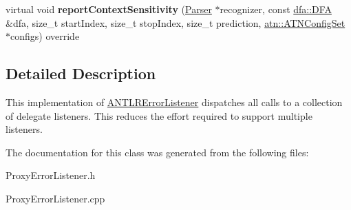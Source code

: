 \begin{DoxyCompactItemize}
\item 
\mbox{\label{classantlr4_1_1ProxyErrorListener_a56e2d5665e2077a9adc67ae70e1deb2a}} 
virtual void {\bfseries report\+Context\+Sensitivity} (\hyperlink{classantlr4_1_1Parser}{Parser} $\ast$recognizer, const \hyperlink{classantlr4_1_1dfa_1_1DFA}{dfa\+::\+D\+FA} \&dfa, size\+\_\+t start\+Index, size\+\_\+t stop\+Index, size\+\_\+t prediction, \hyperlink{classantlr4_1_1atn_1_1ATNConfigSet}{atn\+::\+A\+T\+N\+Config\+Set} $\ast$configs) override
\end{DoxyCompactItemize}


\subsection{Detailed Description}
This implementation of \hyperlink{classantlr4_1_1ANTLRErrorListener}{A\+N\+T\+L\+R\+Error\+Listener} dispatches all calls to a collection of delegate listeners. This reduces the effort required to support multiple listeners. 

The documentation for this class was generated from the following files\+:\begin{DoxyCompactItemize}
\item 
Proxy\+Error\+Listener.\+h\item 
Proxy\+Error\+Listener.\+cpp\end{DoxyCompactItemize}
